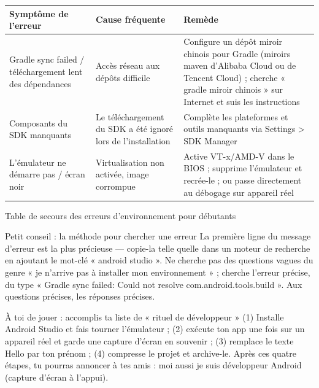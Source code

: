 \begin{center}
\begin{tabularx}{\linewidth}{|X|X|X|}
\hline
\textbf{Symptôme de l'erreur} & \textbf{Cause fréquente} & \textbf{Remède} \tabularnewline
\hline
Gradle sync failed / téléchargement lent des dépendances & Accès réseau aux dépôts difficile & Configure un dépôt miroir chinois pour Gradle (miroirs maven d'Alibaba Cloud ou de Tencent Cloud) ; cherche « gradle miroir chinois » sur Internet et suis les instructions \tabularnewline
Composants du SDK manquants & Le téléchargement du SDK a été ignoré lors de l'installation & Complète les plateformes et outils manquants via Settings > SDK Manager \tabularnewline
L'émulateur ne démarre pas / écran noir & Virtualisation non activée, image corrompue & Active VT-x/AMD-V dans le BIOS ; supprime l'émulateur et recrée-le ; ou passe directement au débogage sur appareil réel \tabularnewline
\hline
\end{tabularx}
\end{center}

\begin{center}\small\color{gray}Table de secours des erreurs d'environnement pour débutants\end{center}

\begin{tcbinfo}{Petit conseil : la méthode pour chercher une erreur}
La première ligne du message d'erreur est la plus précieuse — copie-la telle quelle dans un moteur de recherche en ajoutant le mot-clé « android studio ». Ne cherche pas des questions vagues du genre « je n'arrive pas à installer mon environnement » ; cherche l'erreur précise, du type « Gradle sync failed: Could not resolve com.android.tools.build ». Aux questions précises, les réponses précises.

\end{tcbinfo}

\begin{tcbpractice}{À toi de jouer : accomplis ta liste de « rituel de développeur »}
(1) Installe Android Studio et fais tourner l'émulateur ; (2) exécute ton app une fois sur un appareil réel et garde une capture d'écran en souvenir ; (3) remplace le texte Hello par ton prénom ; (4) compresse le projet et archive-le. Après ces quatre étapes, tu pourras annoncer à tes amis : moi aussi je suis développeur Android (capture d'écran à l'appui).

\end{tcbpractice}

